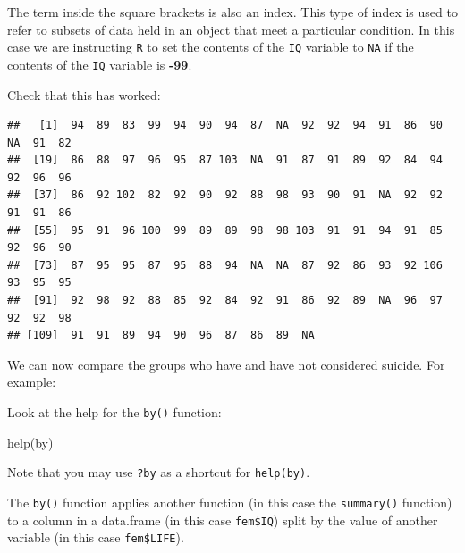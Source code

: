 \documentclass[
  12pt,
]{book}
\newenvironment{Shaded}{\begin{snugshade}}{\end{snugshade}}
\newcommand{\FunctionTok}[1]{\textcolor[rgb]{0.00,0.00,0.00}{#1}}
\newcommand{\NormalTok}[1]{#1}
\newcommand{\SpecialCharTok}[1]{\textcolor[rgb]{0.00,0.00,0.00}{#1}}
\begin{document}
The term inside the square brackets is also an index. This type of index is used to refer to subsets of data held in an object that meet a particular condition. In this case we are instructing \texttt{R} to set the contents of the \texttt{IQ} variable to \texttt{NA} if the contents of the \texttt{IQ} variable is \textbf{-99}.

\newpage

Check that this has worked:

\begin{Shaded}
\end{Shaded}

\begin{verbatim}
##   [1]  94  89  83  99  94  90  94  87  NA  92  92  94  91  86  90  NA  91  82
##  [19]  86  88  97  96  95  87 103  NA  91  87  91  89  92  84  94  92  96  96
##  [37]  86  92 102  82  92  90  92  88  98  93  90  91  NA  92  92  91  91  86
##  [55]  95  91  96 100  99  89  89  98  98 103  91  91  94  91  85  92  96  90
##  [73]  87  95  95  87  95  88  94  NA  NA  87  92  86  93  92 106  93  95  95
##  [91]  92  98  92  88  85  92  84  92  91  86  92  89  NA  96  97  92  92  98
## [109]  91  91  89  94  90  96  87  86  89  NA
\end{verbatim}

We can now compare the groups who have and have not considered suicide. For example:

\begin{Shaded}
\end{Shaded}

Look at the help for the \texttt{by()} function:

\begin{Shaded}
\begin{Highlighting}[]
\FunctionTok{help}\NormalTok{(by)}
\end{Highlighting}
\end{Shaded}

Note that you may use \texttt{?by} as a shortcut for \texttt{help(by)}.

The \texttt{by()} function applies another function (in this case the \texttt{summary()} function) to a column in a
data.frame (in this case \texttt{fem\$IQ}) split by the value of another variable (in this case \texttt{fem\$LIFE}).
\end{document}

